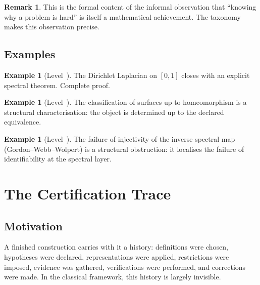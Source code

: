 \documentclass[11pt,a4paper]{article}
\theoremstyle{definition}
\newtheorem{example}[definition]{Example}
\newtheorem{remark}[definition]{Remark}
\theoremstyle{plain}
\begin{document}
\begin{remark}
This is the formal content of the informal observation that
``knowing why a problem is hard'' is itself a mathematical
achievement. The taxonomy makes this observation precise.
\end{remark}

\subsection{Examples}

\begin{example}[Level~\RomanI]
The Dirichlet Laplacian on $[0,1]$ closes with an explicit
spectral theorem. Complete proof.
\end{example}

\begin{example}[Level~\RomanIV]
The classification of surfaces up to homeomorphism is a structural
characterisation: the object is determined up to the declared
equivalence.
\end{example}

\begin{example}[Level~\RomanVI]
The failure of injectivity of the inverse spectral map (Gordon--Webb--Wolpert)
is a structural obstruction: it localises the failure of
identifiability at the spectral layer.
\end{example}

\section{The Certification Trace}
\label{sec:trace}

\subsection{Motivation}

A finished construction carries with it a history: definitions
were chosen, hypotheses were declared, representations were
applied, restrictions were imposed, evidence was gathered,
verifications were performed, and corrections were made. In the
classical framework, this history is largely invisible.
\end{document}
